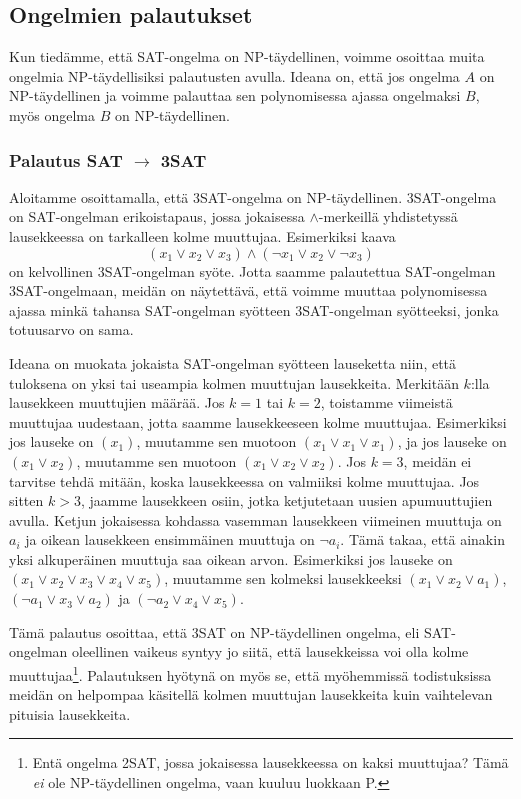\subsection{Ongelmien palautukset}


Kun tiedämme, että SAT-ongelma on NP-täydellinen,
voimme osoittaa muita ongelmia NP-täydellisiksi palautusten avulla.
Ideana on, että jos ongelma $A$ on NP-täydellinen ja
voimme palauttaa sen polynomisessa ajassa ongelmaksi $B$,
myös ongelma $B$ on NP-täydellinen.

\subsubsection{Palautus SAT $\rightarrow$ 3SAT}


Aloitamme osoittamalla, että 3SAT-ongelma on NP-täydellinen.
3SAT-on\-gelma on SAT-ongelman erikoistapaus, jossa jokaisessa
$\land$-merkeillä yhdistetyssä lausekkeessa on tarkalleen kolme muuttujaa.
Esimerkiksi kaava
\[(x_1 \lor x_2 \lor x_3) \land (\neg x_1 \lor x_2 \lor \neg x_3)\]
on kelvollinen 3SAT-ongelman syöte.
Jotta saamme palautettua SAT-ongel\-man 3SAT-ongelmaan,
meidän on näytettävä, että voimme muuttaa polynomisessa ajassa
minkä tahansa SAT-ongelman syötteen 3SAT-ongelman syötteeksi,
jonka totuusarvo on sama.

Ideana on muokata jokaista SAT-ongelman syötteen lauseketta niin, 
että tuloksena on yksi tai useampia kolmen muuttujan lausekkeita.
Merkitään $k$:lla lausekkeen muuttujien määrää.
Jos $k=1$ tai $k=2$, toistamme viimeistä muuttujaa uudestaan,
jotta saamme lausekkeeseen kolme muuttujaa.
Esimerkiksi jos lauseke on $(x_1)$, muutamme sen muotoon
$(x_1 \lor x_1 \lor x_1)$, ja jos lauseke on $(x_1 \lor x_2)$, muutamme
sen muotoon $(x_1 \lor x_2 \lor x_2)$.
Jos $k=3$, meidän ei tarvitse tehdä mitään, koska lausekkeessa
on valmiiksi kolme muuttujaa. Jos sitten $k>3$,
jaamme lausekkeen osiin, jotka ketjutetaan uusien apumuuttujien avulla.
Ketjun jokaisessa kohdassa vasemman lausekkeen viimeinen
muuttuja on $a_i$ ja oikean lausekkeen ensimmäinen muuttuja on $\neg a_i$.
Tämä takaa, että ainakin yksi alkuperäinen muuttuja saa oikean arvon.
Esimerkiksi jos lauseke on $(x_1 \lor x_2 \lor x_3 \lor x_4 \lor x_5)$,
muutamme sen kolmeksi lausekkeeksi $(x_1 \lor x_2 \lor a_1)$,
$(\neg a_1 \lor x_3 \lor a_2)$ ja $(\neg a_2 \lor x_4 \lor x_5)$.

Tämä palautus osoittaa, että 3SAT on NP-täydellinen ongelma,
eli SAT-ongelman oleellinen vaikeus syntyy jo siitä, että lausekkeissa
voi olla kolme muuttujaa\footnote{Entä ongelma 2SAT, jossa jokaisessa lausekkeessa
on kaksi muuttujaa? Tämä \emph{ei} ole NP-täydellinen ongelma,
vaan kuuluu luokkaan P.}.
Palautuksen hyötynä on myös se, että myöhemmissä todistuksissa
meidän on helpompaa käsitellä kolmen muuttujan lausekkeita
kuin vaihtelevan pituisia lausekkeita.

